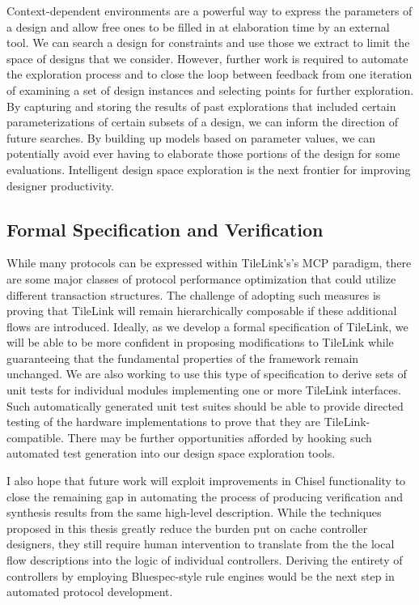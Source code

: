Context-dependent environments are a powerful way to express the parameters of a design and allow free ones
to be filled in at elaboration time by an external tool.
We can search a design for constraints and use those we extract to limit the space of designs that we consider.
However, further work is required to automate the exploration process and 
to close the loop between feedback from one iteration of examining a
set of design instances and selecting points for further exploration.
By capturing and storing the results of past explorations that included certain parameterizations
of certain subsets of a design, we can inform the direction of future searches.
By building up models based on parameter values, we can potentially avoid ever having to elaborate those
portions of the design for some evaluations.
Intelligent design space exploration is the next frontier for improving designer productivity.

\subsection{Formal Specification and Verification}

While many protocols can be expressed within TileLink's's MCP paradigm,
there are some major classes of protocol performance optimization that could
utilize different transaction structures.
The challenge of adopting such measures is proving that TileLink will remain hierarchically composable
if these additional flows are introduced.
Ideally, as we develop a formal specification of TileLink, we will be able to be more confident
in proposing modifications to TileLink while guaranteeing that the fundamental properties of the framework remain unchanged.
We are also working to use this type of specification to derive sets of unit tests for individual modules
implementing one or more TileLink interfaces.
Such automatically generated unit test suites should be able to provide directed
testing of the hardware implementations to prove that they are TileLink-compatible.
There may be further opportunities afforded by hooking such automated test generation into our design space exploration tools.

I also hope that future work will exploit improvements in Chisel functionality to close the remaining gap in
automating the process of producing verification and synthesis results from the same high-level description.
While the techniques proposed in this thesis greatly reduce the burden put on cache controller designers,
they still require human intervention to translate from the the local flow descriptions into the logic of individual controllers.
Deriving the entirety of controllers by employing Bluespec-style rule engines would be the next step in
automated protocol development.


